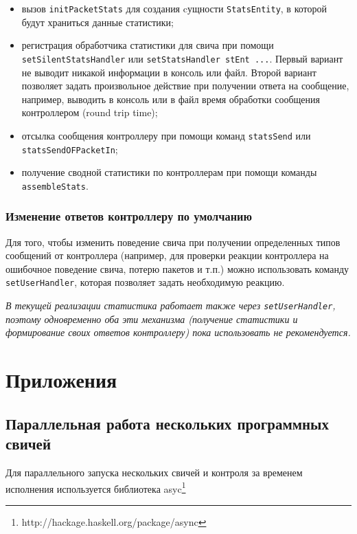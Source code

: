 \documentclass[9pt,a4paper]{article}
\begin{document}
\begin{itemize}
  \item вызов \lstinline!initPacketStats! для создания cущности
    \lstinline!StatsEntity!, в которой будут храниться данные статистики;
  \item регистрация обработчика статистики для свича при помощи
    \lstinline!setSilentStatsHandler! или \lstinline!setStatsHandler stEnt ...!.
    Первый вариант не выводит никакой информации в консоль или файл.  Второй
    вариант позволяет задать произвольное действие при получении ответа на
    сообщение, например, выводить в консоль или в файл время обработки
    сообщения контроллером (round trip time);
  \item отсылка сообщения контроллеру при помощи команд \lstinline!statsSend!
    или \lstinline!statsSendOFPacketIn!;
  \item получение сводной статистики по контроллерам при помощи команды
    \lstinline!assembleStats!.
\end{itemize}

\subsubsection{Изменение ответов контроллеру по умолчанию}

Для того, чтобы изменить поведение свича при получении определенных типов
сообщений от контроллера (например, для проверки реакции контроллера на
ошибочное поведение свича, потерю пакетов и т.п.)  можно использовать команду
\lstinline!setUserHandler!, которая позволяет задать необходимую реакцию.

\emph{В текущей реализации статистика работает также через
  \lstinline!setUserHandler!, поэтому одновременно оба эти механизма (получение
  статистики и формирование своих ответов контроллеру) пока использовать не
  рекомендуется.}

\section{Приложения}

\subsection{Параллельная работа нескольких программных свичей}

Для параллельного запуска нескольких свичей и контроля за временем исполнения
используется библиотека asyc\footnote{http://hackage.haskell.org/package/async}
\end{document}
